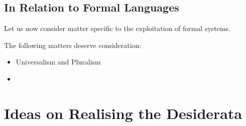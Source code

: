 \documentclass[numreferences]{rbjk}
\begin{document}
\begin{article}
\subsection{In Relation to Formal Languages}

Let us now consider matter specific to the exploitation of formal systems.

The following matters deserve consideration:

\begin{itemize}
\item Universalism and Pluralism
\item 

\end{itemize}

\section{Ideas on Realising the Desiderata}


%
%


\end{article}
\end{document}
